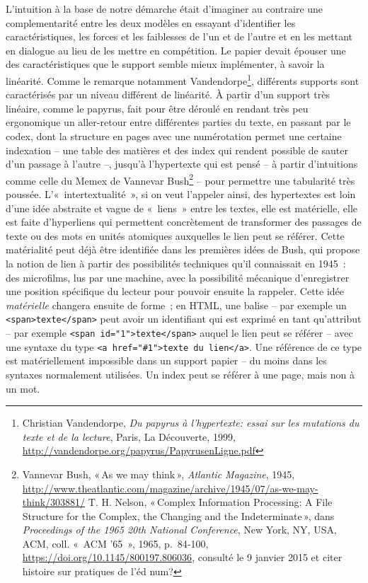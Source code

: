 L'intuition à la base de notre démarche était d'imaginer au contraire
une complementarité entre les deux modèles en essayant d'identifier les
caractéristiques, les forces et les faiblesses de l'un et de l'autre et
en les mettant en dialogue au lieu de les mettre en compétition. Le
papier devait épouser une des caractéristiques que le support semble
mieux implémenter, à savoir la linéarité. Comme le remarque notamment
Vandendorpe\footnote{Christian Vandendorpe, \emph{Du papyrus à
  l'hypertexte: essai sur les mutations du texte et de la lecture},
  Paris, La Découverte, 1999,
  \url{http://vandendorpe.org/papyrus/PapyrusenLigne.pdf}}, différents
supports sont caractérisés par un niveau différent de linéarité. À
partir d'un support très linéaire, comme le papyrus, fait pour être
déroulé en rendant très peu ergonomique un aller-retour entre
différentes parties du texte, en passant par le codex, dont la structure
en pages avec une numérotation permet une certaine indexation -- une
table des matières et des index qui rendent possible de sauter d'un
passage à l'autre --, jusqu'à l'hypertexte qui est pensé -- à partir
d'intuitions comme celle du Memex de Vannevar Bush\footnote{Vannevar
  Bush, {«\,As we may think\,»}, \emph{Atlantic Magazine}, 1945,
  \url{http://www.theatlantic.com/magazine/archive/1945/07/as-we-may-think/303881/}
  T. H. Nelson, {«\,Complex {Information} {Processing}: {A} {File}
  {Structure} for the {Complex}, the {Changing} and the
  {Indeterminate}\,»}, dans \emph{Proceedings of the 1965 20th
  {National} {Conference}}, New York, NY, USA, ACM, coll. «~{ACM} '65~»,
  1965, p.~84‑100, \url{https://doi.org/10.1145/800197.806036}, consulté
  le 9 janvier 2015 et citer histoire sur pratiques de l'éd num?} --
pour permettre une tabularité très poussée. L'«~intertextualité~», si on
veut l'appeler ainsi, des hypertextes est loin d'une idée abstraite et
vague de «~liens~» entre les textes, elle est matérielle, elle est faite
d'hyperliens qui permettent concrètement de transformer des passages de
texte ou des mots en unités atomiques auxquelles le lien peut se
référer. Cette matérialité peut déjà être identifiée dans les premières
idées de Bush, qui propose la notion de lien à partir des possibilités
techniques qu'il connaissait en 1945~: des microfilms, lus par une
machine, avec la possibilité mécanique d'enregistrer une position
spécifique du lecteur pour pouvoir ensuite la rappeler. Cette idée
\emph{matérielle} changera ensuite de forme~; en HTML, une balise -- par
exemple un
\texttt{\textless{}span\textgreater{}texte\textless{}/span\textgreater{}}
peut avoir un identifiant qui est exprimé en tant qu'attribut -- par
exemple
\texttt{\textless{}span\ id="1"\textgreater{}texte\textless{}/span\textgreater{}}
auquel le lien peut se référer -- avec une syntaxe du type
\texttt{\textless{}a\ href="\#1"\textgreater{}texte\ du\ lien\textless{}/a\textgreater{}}.
Une référence de ce type est matériellement impossible dans un support
papier -- du moins dans les syntaxes normalement utilisées. Un index
peut se référer à une page, mais non à un mot.

